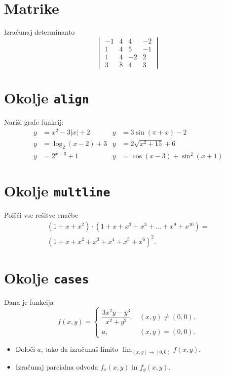 \documentclass[a4paper,12pt]{article}
\begin{document}
\section*{Matrike}
Izračunaj determinanto
\[
\begin{vmatrix}
   -1 & 4 &  4 & -2 \\
    1 & 4 &  5 & -1 \\
    1 & 4 & -2 &  2 \\
    3 & 8 &  4 &  3
\end{vmatrix}
\]

\section*{Okolje \texttt{align}}
Nariši grafe funkcij:
\begin{align*}
   y &= x^2 - 3|x| + 2     & y &= 3 \sin(\pi+x) - 2 \\
   y &= \log_2(x-2) + 3    & y &= 2 \sqrt{x^2+15} + 6 \\
   y &= 2^{x-3} + 1        & y &= \cos(x-3) + \sin^2(x+1)
\end{align*}

\section*{Okolje \texttt{multline}}
Poišči vse rešitve enačbe
\begin{multline*}
   (1+x+x^2) \cdot (1+x+x^2+x^3+\ldots+x^9+x^{10}) = \\
   (1+x+x^2+x^3+x^4+x^5+x^6)^2.
\end{multline*}

\section*{Okolje \texttt{cases}}
Dana je funkcija
\[
f(x,y) = \begin{cases}
   \dfrac{3x^2y-y^3}{x^2+y^2}, & (x,y) \neq (0,0), \\[2mm]
   a, & (x,y) = (0,0).
\end{cases}
\]
\begin{itemize}
\item Določi \(a\), tako da izračunaš limito \( \lim_{(x,y)\to(0,0)} f(x,y) \).
\item Izračunaj parcialna odvoda \(f_x(x,y)\) in \(f_y(x,y)\).
\end{itemize}
\end{document}
